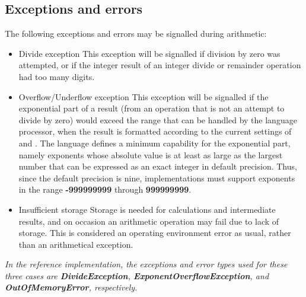 \subsection{Exceptions and errors}
 The following exceptions and errors may be signalled during arithmetic:
\begin{itemize}
\item Divide exception
 This exception will be signalled if division by zero was attempted,
or if the integer result of an integer divide or remainder operation had
too many digits.
\item Overflow/Underflow exception
 This exception will be signalled if the exponential part of a result
(from an operation that is not an attempt to divide by zero) would
exceed the range that can be handled by the language processor, when the
result is formatted according to the current settings of  and .
The language defines a minimum capability for the exponential part,
namely exponents whose absolute value is at least as large as the
largest number that can be expressed as an exact integer in default
precision.
Thus, since the default precision is nine, implementations must support
exponents in the range \textbf{-999999999}
through \textbf{999999999}.
\item Insufficient storage
 Storage is needed for calculations and intermediate results, and on
occasion an arithmetic operation may fail due to lack of storage.
This is considered an operating environment error as usual, rather
than an arithmetical exception.
\end{itemize}
 \emph{In the reference implementation, the exceptions and error types
used for these three cases
are \textbf{DivideException}, \textbf{ExponentOverflowException},
and \textbf{OutOfMemoryError}, respectively.}
\index{,}
\index{,}
\index{,}
